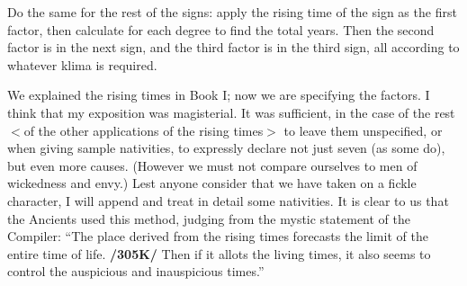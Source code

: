 Do the same for the rest of the signs: apply the rising time of the sign as the first factor, then calculate for each degree to find the total years. Then the second factor is in the next sign, and the third factor is in
the third sign, all according to whatever klima is required.

We explained the rising times in Book I; now we are specifying the factors. I think that my exposition was magisterial. It was sufficient, in the case of the rest $<$of the other applications of the rising
times$>$ to leave them unspecified, or when giving sample nativities, to expressly declare not just seven (as some do), but even more causes. (However we must not compare ourselves to men of wickedness and envy.) Lest anyone consider that we have taken on a fickle character, I will append and treat in detail some nativities. It is clear to us that the Ancients used this method, judging from the mystic statement of the Compiler: “The place derived from the rising times forecasts the limit of the entire time of life. \textbf{/305K/} Then if it allots the living times, it also seems to control the auspicious and inauspicious times.”

\newpage